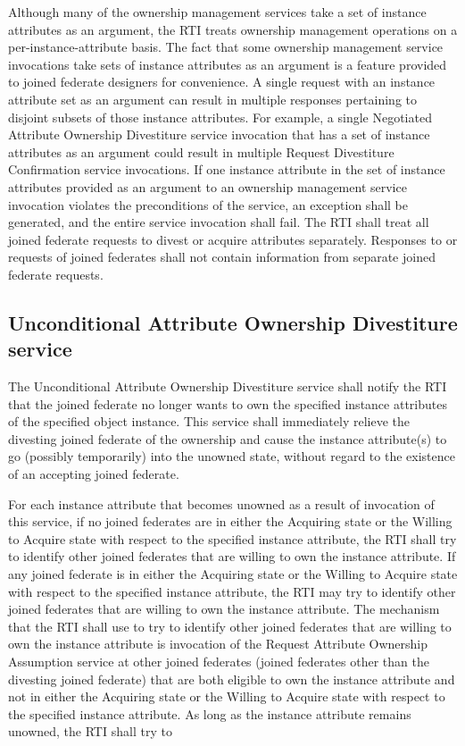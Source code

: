 \begin{compactstdpage}
    Although many of the ownership management services take a set of instance attributes as an argument, the RTI treats ownership management operations on a per-instance-attribute basis. The fact that some ownership management service invocations take sets of instance attributes as an argument is a feature provided to joined federate designers for convenience. A single request with an instance attribute set as an argument can result in multiple responses pertaining to disjoint subsets of those instance attributes. For example, a single Negotiated Attribute Ownership Divestiture service invocation that has a set of instance attributes as an argument could result in multiple Request Divestiture Confirmation \rtiinitiated{} service invocations. If one instance attribute in the set of instance attributes provided as an argument to an ownership management service invocation violates the preconditions of the service, an exception shall be generated, and the entire service invocation shall fail. The RTI shall treat all joined federate requests to divest or acquire attributes separately. Responses to or requests of joined federates shall not contain information from separate joined federate requests.

    \subsection{Unconditional Attribute Ownership Divestiture service}


    The Unconditional Attribute Ownership Divestiture service shall notify the RTI that the joined federate no longer wants to own the specified instance attributes of the specified object instance. This service shall immediately relieve the divesting joined federate of the ownership and cause the instance attribute(s) to go (possibly temporarily) into the unowned state, without regard to the existence of an accepting joined federate.


    For each instance attribute that becomes unowned as a result of invocation of this service, if no joined federates are in either the Acquiring state or the Willing to Acquire state with respect to the specified instance attribute, the RTI shall try to identify other joined federates that are willing to own the instance attribute. If any joined federate is in either the Acquiring state or the Willing to Acquire state with respect to the specified instance attribute, the RTI may try to identify other joined federates that are willing to own the instance attribute. The mechanism that the RTI shall use to try to identify other joined federates that are willing to own the instance attribute is invocation of the Request Attribute Ownership Assumption \rtiinitiated{} service at other joined federates (joined federates other than the divesting joined federate) that are both eligible to own the instance attribute and not in either the Acquiring state or the Willing to Acquire state with respect to the specified instance attribute. As long as the instance attribute remains unowned, the RTI shall try to

\end{compactstdpage}

